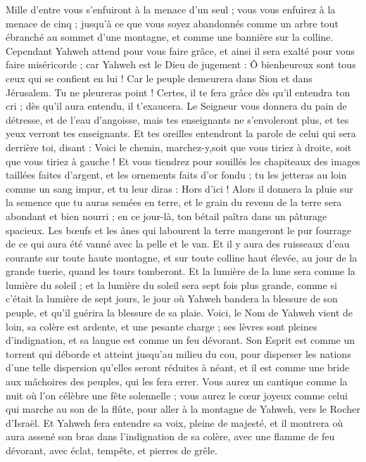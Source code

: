\begin{multicols}{2}
Mille d'entre vous s'enfuiront à la menace d'un seul ; vous vous enfuirez à la menace de cinq ; jusqu'à ce que vous soyez abandonnés comme un arbre tout ébranché au sommet d'une montagne, et comme une bannière sur la colline.
Cependant Yahweh attend pour vous faire grâce, et ainsi il sera exalté pour vous faire miséricorde ; car Yahweh est le Dieu de jugement : Ô bienheureux sont tous ceux qui se confient en lui !
Car le peuple demeurera dans Sion et dans Jérusalem. Tu ne pleureras point ! Certes, il te fera grâce dès qu'il entendra ton cri ; dès qu'il aura entendu, il t'exaucera.
Le Seigneur vous donnera du pain de détresse, et de l'eau d'angoisse, mais tes enseignants ne s'envoleront plus, et tes yeux verront tes enseignants.
Et tes oreilles entendront la parole de celui qui sera derrière toi, disant : Voici le chemin, marchez-y,soit que vous tiriez à droite, soit que vous tiriez à gauche !
Et vous tiendrez pour souillés les chapiteaux des images taillées faites d'argent, et les ornements faits d'or fondu ; tu les jetteras au loin comme un sang impur, et tu leur diras : Hors d'ici ! 
Alors il donnera la pluie sur la semence que tu auras semées en terre, et le grain du revenu de la terre sera abondant et bien nourri ; en ce jour-là, ton bétail paîtra dans un pâturage spacieux.
Les bœufs et les ânes qui labourent la terre mangeront le pur fourrage de ce qui aura été vanné avec la pelle et le van.
Et il y aura des ruisseaux d'eau courante sur toute haute montagne, et sur toute colline haut élevée, au jour de la grande tuerie, quand les tours tomberont.
Et la lumière de la lune sera comme la lumière du soleil ; et la lumière du soleil sera sept fois plus grande, comme si c'était la lumière de sept jours, le jour où Yahweh bandera la blessure de son peuple, et qu'il guérira la blessure de sa plaie.
Voici, le Nom de Yahweh vient de loin, sa colère est ardente, et une pesante charge ; ses lèvres sont pleines d'indignation, et sa langue est comme un feu dévorant.
Son Esprit est comme un torrent qui déborde et atteint jusqu'au milieu du cou, pour disperser les nations d'une telle dispersion qu'elles seront réduites à néant, et il est comme une bride aux mâchoires des peuples, qui les fera errer.
Vous aurez un cantique comme la nuit où l'on célèbre une fête solennelle ; vous aurez le cœur joyeux comme celui qui marche au son de la flûte, pour aller à la montagne de Yahweh, vers le Rocher d'Israël.
Et Yahweh fera entendre sa voix, pleine de majesté, et il montrera où aura assené son bras dans l'indignation de sa colère, avec une flamme de feu dévorant, avec éclat, tempête, et pierres de grêle.

\end{multicols}
